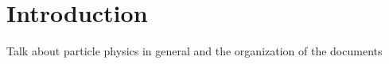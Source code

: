 \chapter{Introduction}
\label{ch:intro}

Talk about particle physics in general and the organization of the documents